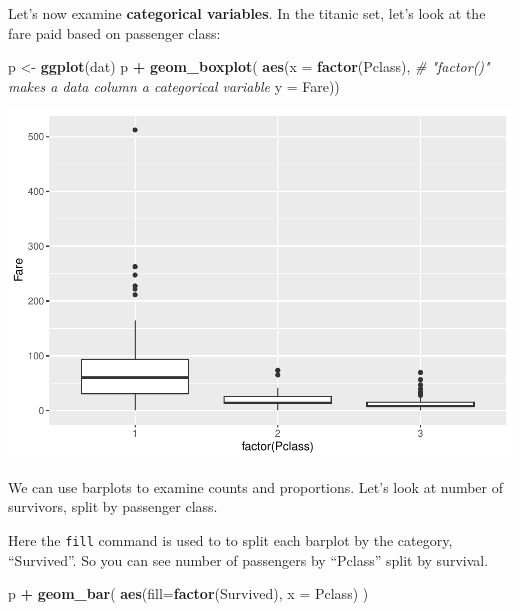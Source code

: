 \documentclass[
]{book}
\newenvironment{Shaded}{\begin{snugshade}}{\end{snugshade}}
\newcommand{\AttributeTok}[1]{\textcolor[rgb]{0.13,0.29,0.53}{#1}}
\newcommand{\CommentTok}[1]{\textcolor[rgb]{0.56,0.35,0.01}{\textit{#1}}}
\newcommand{\FunctionTok}[1]{\textcolor[rgb]{0.13,0.29,0.53}{\textbf{#1}}}
\newcommand{\NormalTok}[1]{#1}
\newcommand{\OtherTok}[1]{\textcolor[rgb]{0.56,0.35,0.01}{#1}}
\newcommand{\SpecialCharTok}[1]{\textcolor[rgb]{0.81,0.36,0.00}{\textbf{#1}}}
\begin{document}
Let's now examine \textbf{categorical variables}. In the titanic set, let's look at the fare paid based on passenger class:

\begin{Shaded}
\begin{Highlighting}[]
\NormalTok{p }\OtherTok{\textless{}{-}} \FunctionTok{ggplot}\NormalTok{(dat)}
\NormalTok{p }\SpecialCharTok{+} \FunctionTok{geom\_boxplot}\NormalTok{(}
    \FunctionTok{aes}\NormalTok{(}\AttributeTok{x =} \FunctionTok{factor}\NormalTok{(Pclass), }\CommentTok{\# "factor()" makes a data column a categorical variable}
        \AttributeTok{y =}\NormalTok{ Fare))}
\end{Highlighting}
\end{Shaded}

\includegraphics{_main_files/figure-latex/boxplot-1.pdf}

We can use barplots to examine counts and proportions. Let's look at number of survivors, split by passenger class.

Here the \texttt{fill} command is used to to split each barplot by the category, ``Survived''.
So you can see number of passengers by ``Pclass'' split by survival.

\begin{Shaded}
\begin{Highlighting}[]
\NormalTok{p }\SpecialCharTok{+} \FunctionTok{geom\_bar}\NormalTok{(}
    \FunctionTok{aes}\NormalTok{(}\AttributeTok{fill=}\FunctionTok{factor}\NormalTok{(Survived), }
        \AttributeTok{x =}\NormalTok{ Pclass)}
\NormalTok{)}
\end{Highlighting}
\end{Shaded}
\end{document}
